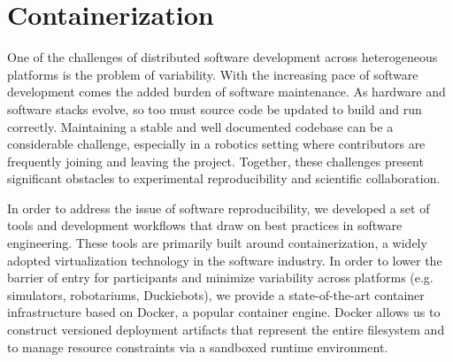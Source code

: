 \documentclass[12pt,initial,twoside,maitrise]{dms}
\numberwithin{equation}{section}
\numberwithin{table}{chapter}
\numberwithin{figure}{chapter}
\begin{document}
\section{Containerization}\label{sec:containerization}

One of the challenges of distributed software development across heterogeneous platforms is the problem of variability. With the increasing pace of software development comes the added burden of software maintenance. As hardware and software stacks evolve, so too must source code be updated to build and run correctly. Maintaining a stable and well documented codebase can be a considerable challenge, especially in a robotics setting where contributors are frequently joining and leaving the project. Together, these challenges present significant obstacles to experimental reproducibility and scientific collaboration.

In order to address the issue of software reproducibility, we developed a set of tools and development workflows that draw on best practices in software engineering. These tools are primarily built around containerization, a widely adopted virtualization technology in the software industry. In order to lower the barrier of entry for participants and minimize variability across platforms (e.g. simulators, robotariums, Duckiebots), we provide a state-of-the-art container infrastructure based on Docker, a popular container engine. Docker allows us to construct versioned deployment artifacts that represent the entire filesystem and to manage resource constraints via a sandboxed runtime environment.
\end{document}
